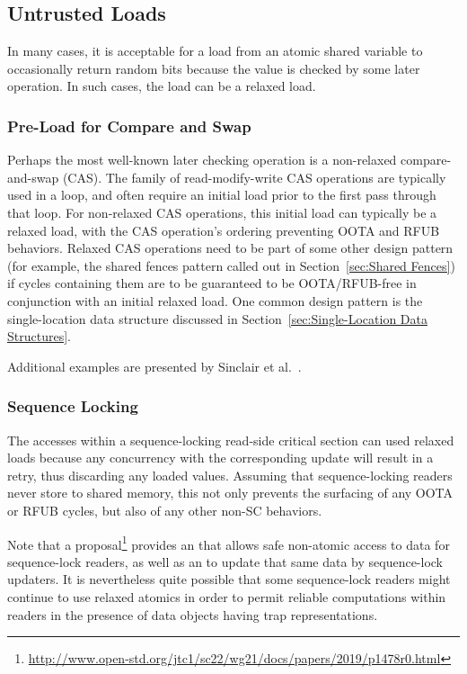\documentclass[10]{article}
\begin{document}
\subsection{Untrusted Loads}
\label{sec:Untrusted Loads}

In many cases, it is acceptable for a load from an atomic shared variable
to occasionally return random bits because the value is checked by
some later operation.
In such cases, the load can be a relaxed load.

\subsubsection{Pre-Load for Compare and Swap}
\label{sec:Pre-Load for Compare and Swap}

Perhaps the most well-known later checking operation is a non-relaxed
compare-and-swap (CAS).
The  family of read-modify-write
CAS operations are typically used in a loop, and often require an initial
load prior to the first pass through that loop.
For non-relaxed CAS operations, this initial load can typically be a
relaxed load, with the CAS operation's ordering preventing OOTA and RFUB
behaviors.
Relaxed CAS operations need to be part of some other design pattern
(for example, the shared fences pattern called out in
Section~\ref{sec:Shared Fences})
if cycles containing them are to be guaranteed to be OOTA/RFUB-free in
conjunction with an initial relaxed load.
One common design pattern is the single-location data structure discussed in
Section~\ref{sec:Single-Location Data Structures}.

Additional examples are presented by
Sinclair et al.~\cite{Sinclair:2017:CAR:3079856.3080206}.

\subsubsection{Sequence Locking}
\label{sec:Sequence Locking}

The accesses within a sequence-locking read-side critical section
can used relaxed loads because any concurrency with the corresponding
update will result in a retry, thus discarding any loaded values.
Assuming that sequence-locking readers never store to shared memory,
this not only prevents the surfacing of any OOTA or RFUB cycles, but
also of any other non-SC behaviors.

Note that a proposal\footnote{
	\url{http://www.open-std.org/jtc1/sc22/wg21/docs/papers/2019/p1478r0.html}}
provides an  that allows safe
non-atomic access to data for sequence-lock readers, as well as an
 to update that same data by
sequence-lock updaters.
It is nevertheless quite possible that some sequence-lock readers
might continue to use relaxed atomics in order to permit reliable
computations within readers in the presence of data objects having
trap representations.
\end{document}
